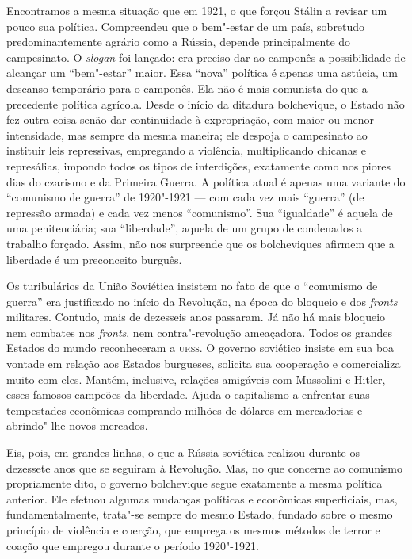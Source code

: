 Encontramos a mesma situação que em 1921, o que forçou Stálin a revisar
um pouco sua política. Compreendeu que o bem"-estar de um país,
sobretudo predominantemente agrário como a Rússia, depende
principalmente do campesinato. O \textit{slogan} foi lançado: era preciso dar ao
camponês a possibilidade de alcançar um “bem"-estar” maior. Essa
“nova” política é apenas uma astúcia, um descanso temporário para o
camponês. Ela não é mais comunista do que a precedente política
agrícola. Desde o início da ditadura bolchevique, o Estado não fez
outra coisa senão dar continuidade à expropriação, com maior ou menor
intensidade, mas sempre da mesma maneira; ele despoja o campesinato ao
instituir leis repressivas, empregando a violência, multiplicando
chicanas e represálias, impondo todos os tipos de interdições,
exatamente como nos piores dias do czarismo e da Primeira Guerra. A
política atual é apenas uma variante do “comunismo de guerra” de
1920"-1921 --- com cada vez mais “guerra” (de repressão armada) e cada
vez menos “comunismo”. Sua “igualdade” é aquela de uma penitenciária;
sua “liberdade”, aquela de um grupo de condenados a trabalho forçado. Assim, não
nos surpreende que os bolcheviques afirmem que a liberdade é um
preconceito burguês.

Os turibulários da União Soviética insistem no fato de que o “comunismo
de guerra” era justificado no início da Revolução, na época do bloqueio
e dos \textit{fronts} militares. Contudo, mais de dezesseis anos passaram. Já não há
mais bloqueio nem combates nos \textit{fronts}, nem contra"-revolução
ameaçadora. Todos os grandes Estados do mundo reconheceram a \textsc{urss}. O
governo soviético insiste em sua boa vontade em relação aos Estados
burgueses, solicita sua cooperação e comercializa muito com eles.
Mantém, inclusive, relações amigáveis com Mussolini e Hitler, esses
famosos campeões da liberdade. Ajuda o capitalismo a enfrentar suas
tempestades econômicas comprando milhões de dólares em mercadorias e
abrindo"-lhe novos mercados.

Eis, pois, em grandes linhas, o que a Rússia soviética realizou durante
os dezessete anos que se seguiram à Revolução. Mas, no que concerne ao
comunismo propriamente dito, o governo bolchevique segue exatamente a
mesma política anterior. Ele efetuou algumas mudanças políticas e
econômicas superficiais, mas, fundamentalmente, trata"-se sempre do
mesmo Estado, fundado sobre o mesmo princípio de violência e coerção,
que emprega os mesmos métodos de terror e coação que empregou durante o período
1920"-1921.

